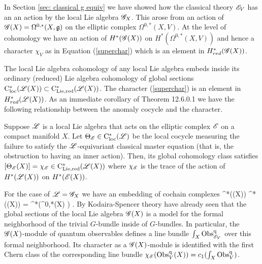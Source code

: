 
In Section \ref{sec: classical g equiv} we have showed how the classical theory $\mathscr E_{V}$ has an an action by the local Lie algebra $\mathscr G_X$.
This arose from an action of $\mathscr G(X) = \Omega^{0,*}(X, \mathfrak g)$ on the elliptic complex $\Omega^{0,*}(X, V)$. 
At the level of cohomology we have an action of $H^*(\mathscr G(X))$ on $H^*(\Omega^{0,*}(X, V))$ and hence a character $\chi_{V}$ as in Equation (\ref{superchar}) which is an element in $H^*_{red}(\mathscr G(X))$. 

The local Lie algebra cohomology of any local Lie algebra embeds inside its ordinary (reduced) Lie algebra cohomology of global sections ${\rm C}_{\rm loc}^*(\mathscr L(X)) \subset {\rm C}_{\rm Lie, red}^*(\mathscr L(X))$. 
The character (\ref{superchar}) is an element in $H_{red}^*(\mathscr L(X))$.
As an immediate corollary of \cite{CG2} Theorem 12.6.0.1 we have the following relationship between the anomaly cocycle and the character.

\begin{prop}\label{inner char}
Suppose $\mathscr L$ is a local Lie algebra that acts on the elliptic complex $\mathscr E$ on a compact manifold $X$.
Let $\Theta_\mathscr E \in {\rm C}_{\rm loc}^*(\mathscr L)$ be the local cocycle measuring the failure to satisfy the $\mathscr L$-equivariant classical master equation (that is, the obstruction to having an inner action).
Then, its global cohomology class satisfies $[\Theta_\mathscr E (X)] = \chi_{\mathscr E} \in {\rm C}_{\rm Lie, red}^*(\mathscr L(X))$ where $\chi_\mathscr E$ is the trace of the action of $H^*(\mathscr L(X))$ on $H^*(\mathscr E(X))$. 
\end{prop}


For the case of $\mathscr L = \mathscr G_X$ we have an embedding of cochain complexes
\ben
\cloc^*(\sG(X)) \hookrightarrow \cred^*(\sG(X)) = \cred^*(\Omega^{0,*}(X) \tensor \fg) .
\een
By Kodaira-Spencer theory have already seen that the global sections of the local Lie algebra $\mathscr G(X)$ is a model for the formal neighborhood of the trivial $G$-bundle inside of $G$-bundles. 
In particular, the $\mathscr G(X)$-module of quantum observables defines a line bundle $\int_X {\rm Obs}^{\rm q}_{\mathscr E_V}$ over this formal neighborhood.
Its character as a $\mathscr G(X)$-module is identified with the first Chern class of the corresponding line bundle $\chi_\mathscr E({\rm Obs}^{\rm q}_{V}(X)) = c_1(\int_X {\rm Obs}^{\rm q}_{V})$. 

